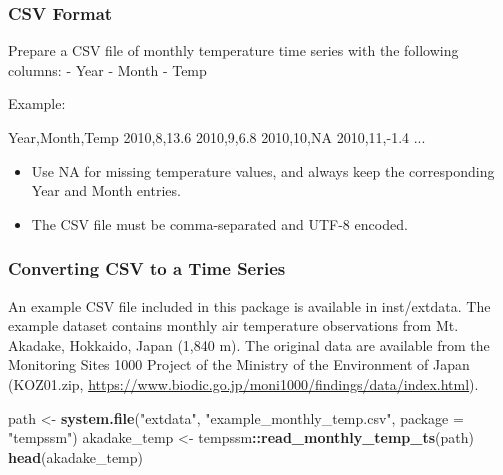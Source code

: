 \documentclass[
]{article}
\newenvironment{Shaded}{\begin{snugshade}}{\end{snugshade}}
\newcommand{\AttributeTok}[1]{\textcolor[rgb]{0.13,0.29,0.53}{#1}}
\newcommand{\FunctionTok}[1]{\textcolor[rgb]{0.13,0.29,0.53}{\textbf{#1}}}
\newcommand{\NormalTok}[1]{#1}
\newcommand{\OtherTok}[1]{\textcolor[rgb]{0.56,0.35,0.01}{#1}}
\newcommand{\SpecialCharTok}[1]{\textcolor[rgb]{0.81,0.36,0.00}{\textbf{#1}}}
\newcommand{\StringTok}[1]{\textcolor[rgb]{0.31,0.60,0.02}{#1}}
\providecommand{\tightlist}{%
  \setlength{\itemsep}{0pt}\setlength{\parskip}{0pt}}
\begin{document}
\subsubsection{CSV Format}\label{csv-format}

Prepare a CSV file of monthly temperature time series with the following
columns: - Year - Month - Temp

Example:

\begin{Shaded}
\begin{Highlighting}[]
\NormalTok{Year,Month,Temp}
\NormalTok{2010,8,13.6}
\NormalTok{2010,9,6.8}
\NormalTok{2010,10,NA}
\NormalTok{2010,11,{-}1.4}
\NormalTok{...}
\end{Highlighting}
\end{Shaded}

\begin{itemize}
\tightlist
\item
  Use NA for missing temperature values, and always keep the
  corresponding Year and Month entries.
\item
  The CSV file must be comma-separated and UTF-8 encoded.
\end{itemize}

\subsubsection{Converting CSV to a Time
Series}\label{converting-csv-to-a-time-series}

An example CSV file included in this package is available in
inst/extdata. The example dataset contains monthly air temperature
observations from Mt. Akadake, Hokkaido, Japan (1,840 m). The original
data are available from the Monitoring Sites 1000 Project of the
Ministry of the Environment of Japan (KOZ01.zip,
\url{https://www.biodic.go.jp/moni1000/findings/data/index.html}).

\begin{Shaded}
\begin{Highlighting}[]
\NormalTok{path }\OtherTok{\textless{}{-}} \FunctionTok{system.file}\NormalTok{(}\StringTok{"extdata"}\NormalTok{, }\StringTok{"example\_monthly\_temp.csv"}\NormalTok{, }\AttributeTok{package =} \StringTok{"tempssm"}\NormalTok{)}
\NormalTok{akadake\_temp }\OtherTok{\textless{}{-}}\NormalTok{ tempssm}\SpecialCharTok{::}\FunctionTok{read\_monthly\_temp\_ts}\NormalTok{(path)}
\FunctionTok{head}\NormalTok{(akadake\_temp)}
\end{Highlighting}
\end{Shaded}
\end{document}
